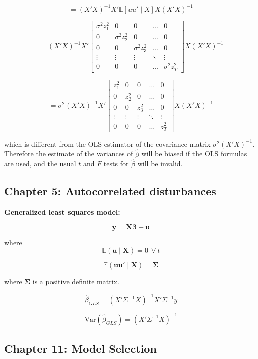 \documentclass{article}
\newcommand{\E}{\mathbb{E}}
\newcommand{\Var}{\mathrm{Var}}
\begin{document}
\[
= (X'X)^{-1}X' \E[uu' \mid X] X(X'X)^{-1}
\]

\[
= (X'X)^{-1}X' \begin{bmatrix}
    \sigma^2 z_1^2 &0 & 0 & \dots & 0 \\
   0 & \sigma^2 z_2^2 &0 & \dots  & 0 \\
   0 & 0 & \sigma^2 z_3^2 & \dots  & 0 \\
    \vdots & \vdots & \vdots & \ddots & \vdots \\
    0 & 0 &0 & \dots  & \sigma^2 z_T^2
\end{bmatrix}  X(X'X)^{-1}
\]

\[
= \sigma^2(X'X)^{-1}X' \begin{bmatrix}
    z_1^2 &0 & 0 & \dots & 0 \\
   0 & z_2^2 &0 & \dots  & 0 \\
   0 & 0 &  z_3^2 & \dots  & 0 \\
    \vdots & \vdots & \vdots & \ddots & \vdots \\
    0 & 0 &0 & \dots  &  z_T^2
\end{bmatrix}  X(X'X)^{-1}
\]

which is different from the OLS estimator of the covariance matrix \(\sigma^2(X'X)^{-1}\). Therefore the estimate of the variances of \(\hat{\beta}\) will be biased if the OLS formulas are used, and the usual \(t\) and \(F\) tests for \(\hat{\beta}\) will be invalid.

\subsection{Chapter 5: Autocorrelated disturbances}

\textbf{Generalized least squares model:}

\[
\boldsymbol{y} = \boldsymbol{X}\boldsymbol{\beta} + \boldsymbol{u}
\]

where
\[
\E(\boldsymbol{u} \mid \boldsymbol{X}) = 0 \ \ \forall \ t
\]

\[
\E(\boldsymbol{u} \boldsymbol{u}' \mid \boldsymbol{X}) = \boldsymbol{\Sigma} 
\]

where \(\boldsymbol{\Sigma}\) is a positive definite matrix.

\[
\hat{\beta}_{GLS} = (X' \Sigma^{-1}X)^{-1}X' \Sigma^{-1}y 
\]

\[
\Var(\hat{\beta}_{GLS}) = (X' \Sigma^{-1} X)^{-1}
\]

\subsection{Chapter 11: Model Selection}
\end{document}
